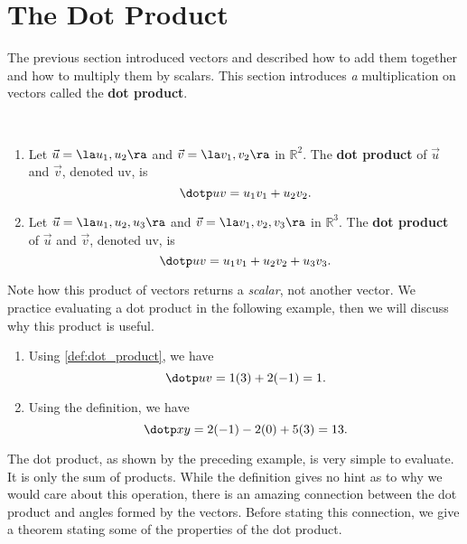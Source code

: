 \section{The Dot Product}\label{sec:dot_product}

The previous section introduced vectors and described how to add them together and how to multiply them by scalars. This section introduces \emph{a} multiplication on vectors called the \textbf{dot product}.

{\mbox{}\\[-2\baselineskip]\begin{enumerate}
	\item Let $\vec u = \la u_1,u_2\ra$ and $\vec v = \la v_1,v_2\ra$  in $\mathbb{R}^2$. The \textbf{dot product} of $\vec u$ and $\vec v$, denoted \dotp uv, is 
	$$\dotp uv = u_1v_1+u_2v_2.$$
	\item Let $\vec u = \la u_1,u_2,u_3\ra$ and $\vec v = \la v_1,v_2,v_3\ra$  in $\mathbb{R}^3$. The \textbf{dot product} of $\vec u$ and $\vec v$, denoted \dotp uv, is 
	$$\dotp uv = u_1v_1+u_2v_2+u_3v_3.$$
\end{enumerate}}

Note how this product of vectors returns a \emph{scalar}, not another vector. We practice evaluating a dot product in the following example, then we will discuss why this product is useful.

{\begin{enumerate}
	\item Using \autoref{def:dot_product}, we have $$\dotp uv = 1(3)+2(-1) = 1.$$
	\item	Using the definition, we have
	$$\dotp xy = 2(-1)  -2(0) + 5(3) = 13.$$
\end{enumerate}}

The dot product, as shown by the preceding example, is very simple to evaluate. It is only the sum of products. While the definition gives no hint as to why we would care about this operation, there is an amazing connection between the dot product and angles formed by the vectors. Before stating this connection, we give a theorem stating some of the properties of the dot product.

